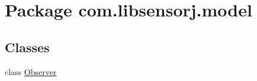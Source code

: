 \hypertarget{namespacecom_1_1libsensorj_1_1model}{}\section{Package com.\+libsensorj.\+model}
\label{namespacecom_1_1libsensorj_1_1model}
\subsection*{Classes}
\begin{DoxyCompactItemize}
\item 
class \hyperlink{classcom_1_1libsensorj_1_1model_1_1Observer}{Observer}
\end{DoxyCompactItemize}

